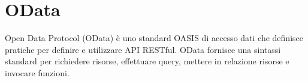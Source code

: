 \section{OData}
Open Data Protocol (OData) è uno standard OASIS \cite{OASIS} di accesso dati  che definisce pratiche per definire e utilizzare API RESTful. \cite{ODATA}
OData fornisce una sintassi standard per richiedere risorse, effettuare query, mettere in relazione risorse e invocare funzioni.